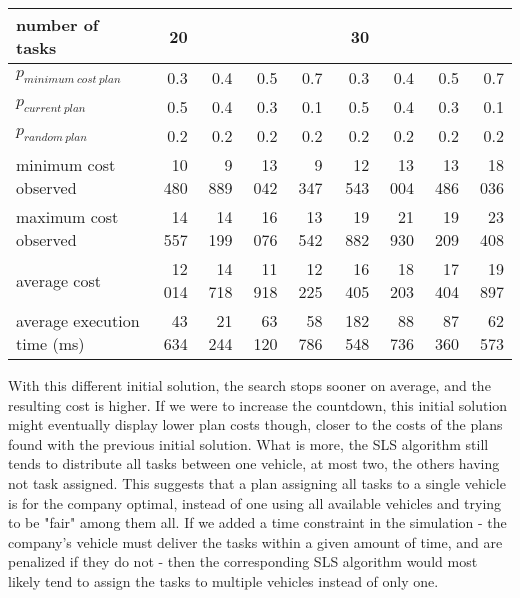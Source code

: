 \documentclass[10pt]{article}
\begin{document}
\begin{tabular}{|l|rrrr|rrrr|}
\hline
number of tasks & 20 & & & & 30 & & & \\
\hline
$p_{minimum\ cost\ plan}$ & 0.3 & 0.4 & 0.5 & 0.7 & 0.3 & 0.4 & 0.5 & 0.7\\
$p_{current\ plan}$       & 0.5 & 0.4 & 0.3 & 0.1 & 0.5 & 0.4 & 0.3 & 0.1\\
$p_{random\ plan}$        & 0.2 & 0.2 & 0.2 & 0.2 & 0.2 & 0.2 & 0.2 & 0.2\\
\hline
minimum cost observed & 10 480 &  9 889 & 13 042 &  9 347 & 12 543 & 13 004 & 13 486 & 18 036\\
maximum cost observed & 14 557 & 14 199 & 16 076 & 13 542 & 19 882 & 21 930 & 19 209 & 23 408\\
\hline
average cost                & 12 014 & 14 718 & 11 918 & 12 225 &  16 405 & 18 203 & 17 404 & 19 897\\
average execution time (ms) & 43 634 & 21 244 & 63 120 & 58 786 & 182 548 & 88 736 & 87 360 & 62 573\\
\hline
\end{tabular}
\label{table:model_parameters_2}
\vspace{4mm}

With this different initial solution, the search stops sooner on average, and the resulting cost is higher. If we were to increase the countdown, this initial solution might eventually display lower plan costs though, closer to the costs of the plans found with the previous initial solution.
What is more, the SLS algorithm still tends to distribute all tasks between one vehicle, at most two, the others having not task assigned.
This suggests that a plan assigning all tasks to a single vehicle is for the company optimal, instead of one using all available vehicles and trying to be "fair" among them all.
If we added a time constraint in the simulation - the company's vehicle must deliver the tasks within a given amount of time, and are penalized if they do not - then the corresponding SLS algorithm would most likely tend to assign the tasks to multiple vehicles instead of only one.
\end{document}
